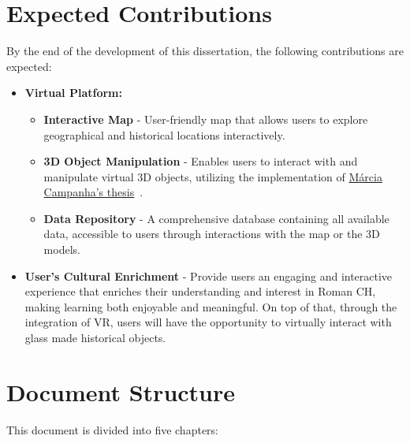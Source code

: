 


\section{Expected Contributions}
\label{sec:expected_contributions}


By the end of the development of this dissertation, the following contributions are expected:


\begin{itemize}
   \item \textbf{Virtual Platform:}
   \begin{itemize}
      \item \textbf{Interactive Map} - User-friendly map that allows users to explore geographical and historical locations interactively.
      \item \textbf{3D Object Manipulation} - Enables users to interact with and manipulate virtual 3D objects, utilizing the implementation of \hyperref[sec:marcia_thesis]{Márcia Campanha's thesis}~\cite{campanha2024heritage}.
      \item  \textbf{Data Repository} - A comprehensive database containing all available data, accessible to users through interactions with the map or the \gls{3D} models.
   \end{itemize}
   \item \textbf{User's Cultural Enrichment} - Provide users an engaging and interactive experience that enriches their understanding and interest
   in Roman \gls{CH}, making learning both enjoyable and meaningful.
   On top of that, through the integration of \gls{VR}, users will have the opportunity to virtually interact with glass made historical objects.
\end{itemize}


\section{Document Structure}
\label{sec:document_structure}


This document is divided into five chapters:


